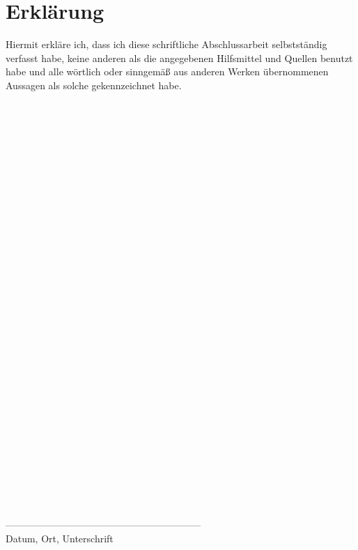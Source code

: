 \section*{Erklärung}
Hiermit erkläre ich, dass ich diese schriftliche Abschlussarbeit selbstständig verfasst habe, keine anderen als die angegebenen Hilfsmittel und Quellen benutzt habe und alle wörtlich oder sinngemäß aus anderen Werken übernommenen Aussagen als solche gekennzeichnet habe.
\begin{verbatim}




































\end{verbatim}
\begin{flushright}
	------------------------------------------------------------\\
	\small Datum, Ort, Unterschrift
\end{flushright}